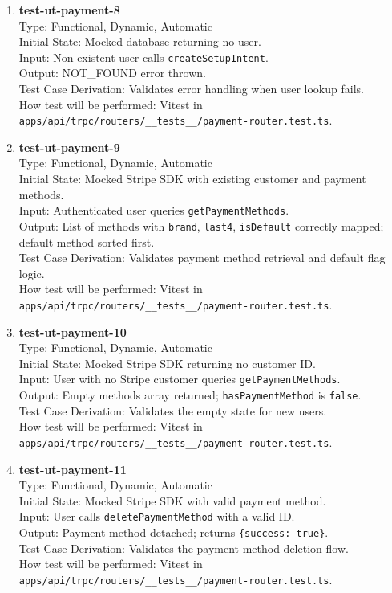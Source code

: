 \documentclass[12pt, titlepage]{article}
\begin{document}
\begin{enumerate}
\item \textbf{test-ut-payment-8}\\
Type: Functional, Dynamic, Automatic\\
Initial State: Mocked database returning no user.\\
Input: Non-existent user calls \texttt{createSetupIntent}.\\
Output: NOT\_FOUND error thrown.\\
Test Case Derivation: Validates error handling when user lookup fails.\\
How test will be performed: Vitest in \texttt{apps/api/trpc/routers/\_\_tests\_\_/payment-router.test.ts}.\\

\item \textbf{test-ut-payment-9}\\
Type: Functional, Dynamic, Automatic\\
Initial State: Mocked Stripe SDK with existing customer and payment methods.\\
Input: Authenticated user queries \texttt{getPaymentMethods}.\\
Output: List of methods with \texttt{brand}, \texttt{last4}, \texttt{isDefault} correctly mapped; default method sorted first.\\
Test Case Derivation: Validates payment method retrieval and default flag logic.\\
How test will be performed: Vitest in \texttt{apps/api/trpc/routers/\_\_tests\_\_/payment-router.test.ts}.\\

\item \textbf{test-ut-payment-10}\\
Type: Functional, Dynamic, Automatic\\
Initial State: Mocked Stripe SDK returning no customer ID.\\
Input: User with no Stripe customer queries \texttt{getPaymentMethods}.\\
Output: Empty methods array returned; \texttt{hasPaymentMethod} is \texttt{false}.\\
Test Case Derivation: Validates the empty state for new users.\\
How test will be performed: Vitest in \texttt{apps/api/trpc/routers/\_\_tests\_\_/payment-router.test.ts}.\\

\item \textbf{test-ut-payment-11}\\
Type: Functional, Dynamic, Automatic\\
Initial State: Mocked Stripe SDK with valid payment method.\\
Input: User calls \texttt{deletePaymentMethod} with a valid ID.\\
Output: Payment method detached; returns \texttt{\{success: true\}}.\\
Test Case Derivation: Validates the payment method deletion flow.\\
How test will be performed: Vitest in \texttt{apps/api/trpc/routers/\_\_tests\_\_/payment-router.test.ts}.\\


\end{enumerate}
\end{document}
